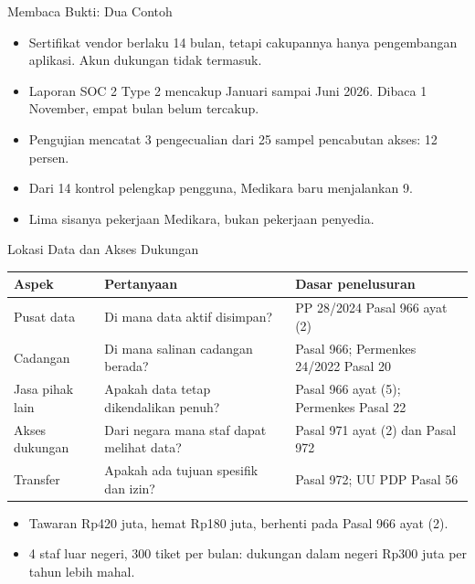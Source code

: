 \documentclass[aspectratio=169, table, 12pt]{beamer}
\begin{document}
\begin{frame}{{\Large Membaca Bukti: Dua Contoh}}
  \vspace{6pt}
  \small
  \begin{itemize}
    \item Sertifikat vendor berlaku 14 bulan, tetapi cakupannya hanya pengembangan aplikasi. Akun
          dukungan tidak termasuk.
    \item Laporan SOC 2 Type 2 mencakup Januari sampai Juni 2026. Dibaca 1 November, empat bulan
          belum tercakup.
    \item Pengujian mencatat 3 pengecualian dari 25 sampel pencabutan akses: 12 persen.
    \item Dari 14 kontrol pelengkap pengguna, Medikara baru menjalankan 9.
    \item Lima sisanya pekerjaan Medikara, bukan pekerjaan penyedia.
  \end{itemize}
\end{frame}

\begin{frame}{{\Large Lokasi Data dan Akses Dukungan}}
  \vspace{2pt}
  \scriptsize
  \begin{tabularx}{\textwidth}{|>{\raggedright\arraybackslash}p{}|>{\raggedright\arraybackslash}X|>{\raggedright\arraybackslash}X|}
    \hline
    \textbf{Aspek} & \textbf{Pertanyaan} & \textbf{Dasar penelusuran} \\ \hline
    Pusat data & Di mana data aktif disimpan? & PP 28/2024 Pasal 966 ayat (2) \\ \hline
    Cadangan & Di mana salinan cadangan berada? & Pasal 966; Permenkes 24/2022 Pasal 20 \\ \hline
    Jasa pihak lain & Apakah data tetap dikendalikan penuh? & Pasal 966 ayat (5); Permenkes Pasal 22
    \\ \hline
    Akses dukungan & Dari negara mana staf dapat melihat data? & Pasal 971 ayat (2) dan Pasal 972 \\
    \hline
    Transfer & Apakah ada tujuan spesifik dan izin? & Pasal 972; UU PDP Pasal 56 \\ \hline
  \end{tabularx}

  \vspace{6pt}
  \small
  \begin{itemize}
    \item Tawaran Rp420 juta, hemat Rp180 juta, berhenti pada Pasal 966 ayat (2).
    \item 4 staf luar negeri, 300 tiket per bulan: dukungan dalam negeri Rp300 juta per tahun lebih
          mahal.
  \end{itemize}
\end{frame}
\end{document}
